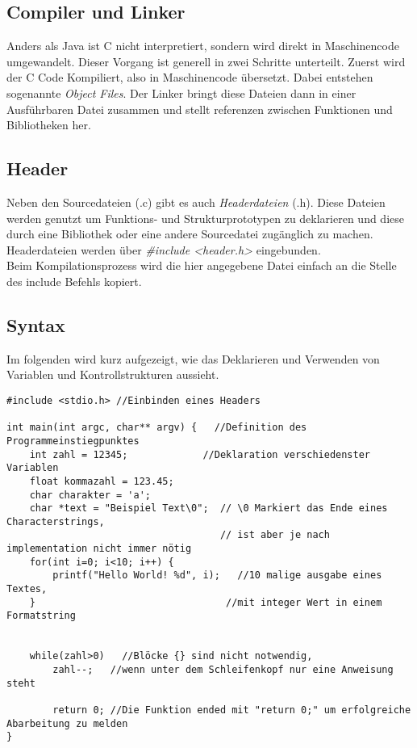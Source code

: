 \documentclass{article}
\begin{document}
\subsection{Compiler und Linker}
Anders als Java ist C nicht interpretiert, sondern wird direkt in Maschinencode umgewandelt. Dieser Vorgang ist generell in zwei Schritte unterteilt. Zuerst wird der C Code Kompiliert, also in Maschinencode übersetzt. Dabei entstehen sogenannte \textit{Object Files}. Der Linker bringt diese Dateien dann in
einer Ausführbaren Datei zusammen und stellt referenzen zwischen Funktionen und Bibliotheken her.

\subsection{Header}
Neben den Sourcedateien (.c) gibt es auch \textit{Headerdateien} (.h). Diese Dateien werden genutzt um Funktions- und Strukturprototypen zu deklarieren und diese durch eine Bibliothek oder eine andere Sourcedatei zugänglich zu machen.
Headerdateien werden über \textit{\#include {\textless}header.h{\textgreater}} eingebunden. \\Beim Kompilationsprozess wird die hier angegebene Datei einfach an die Stelle des include Befehls kopiert.

\newpage
\subsection{Syntax}
Im folgenden wird kurz aufgezeigt, wie das Deklarieren und Verwenden von Variablen und Kontrollstrukturen aussieht.

\begin{verbatim}
#include <stdio.h> //Einbinden eines Headers

int main(int argc, char** argv) {	//Definition des Programmeinstiegpunktes
    int zahl = 12345;             //Deklaration verschiedenster Variablen
    float kommazahl = 123.45;      	
    char charakter = 'a';
    char *text = "Beispiel Text\0";  // \0 Markiert das Ende eines Characterstrings,
                                     // ist aber je nach implementation nicht immer nötig
    for(int i=0; i<10; i++) {
        printf("Hello World! %d", i);	//10 malige ausgabe eines Textes,
    }                                 //mit integer Wert in einem Formatstring
    
	
    while(zahl>0)	//Blöcke {} sind nicht notwendig,
        zahl--;   //wenn unter dem Schleifenkopf nur eine Anweisung steht
		
	    return 0; //Die Funktion ended mit "return 0;" um erfolgreiche Abarbeitung zu melden
}
\end{verbatim}
\end{document}
